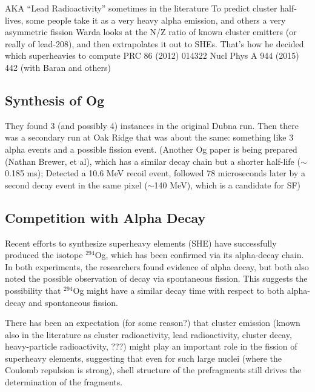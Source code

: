 AKA “Lead Radioactivity” sometimes in the literature
To predict cluster half-lives, some people take it as a very heavy alpha emission, and others a very asymmetric fission
Warda looks at the N/Z ratio of known cluster emitters (or really of lead-208), and then extrapolates it out to SHEs. That’s how he decided which superheavies to compute
PRC 86 (2012) 014322
Nucl Phys A 944 (2015) 442 (with Baran and others)


\subsection{Synthesis of Og}

They found 3 (and possibly 4) instances in the original Dubna run. Then there was a secondary run at Oak Ridge that was about the same: something like 3 alpha events and a possible fission event. (Another Og paper is being prepared (Nathan Brewer, et al), which has a similar decay chain but a shorter half-life ($\sim$0.185 ms); Detected a 10.6 MeV recoil event, followed 78 microseconds later by a second decay event in the same pixel ($\sim$140 MeV), which is a candidate for SF)

\subsection{Competition with Alpha Decay}


Recent efforts to synthesize superheavy elements (SHE) have successfully produced the isotope $^{294}$Og, which has been confirmed via its alpha-decay chain. In both experiments, the researchers found evidence of alpha decay, but both also noted the possible observation of decay via spontaneous fission. This suggests the possibility that $^{294}$Og might have a similar decay time with respect to both alpha-decay and spontaneous fission.

There has been an expectation (for some reason?) that cluster emission (known also in the literature as cluster radioactivity, lead radioactivity, cluster decay, heavy-particle radioactivity, ???) might play an important role in the fission of superheavy elements, suggesting that even for such large nuclei (where the Coulomb repulsion is strong), shell structure of the prefragments still drives the determination of the fragments.

